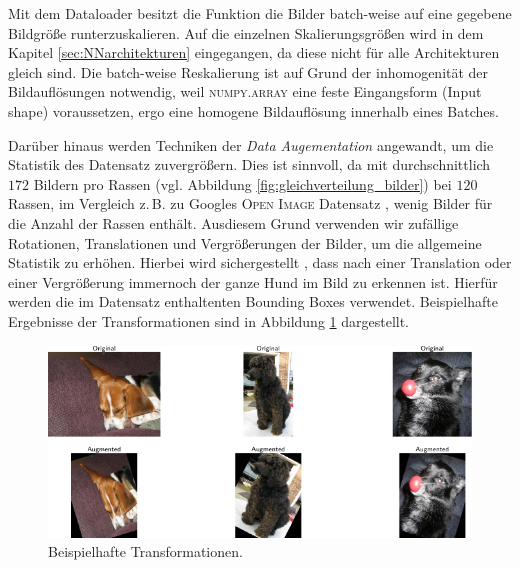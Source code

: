 Mit dem Dataloader besitzt die Funktion die Bilder batch-weise auf eine gegebene
Bildgröße runterzuskalieren. Auf die einzelnen Skalierungsgrößen wird in dem
Kapitel \ref{sec:NNarchitekturen} eingegangen, da diese nicht für alle Architekturen
gleich sind. Die batch-weise Reskalierung ist auf Grund der inhomogenität
der Bildauflösungen notwendig, weil \textsc{numpy.array}
eine feste Eingangsform (Input shape) voraussetzen, ergo eine homogene Bildauflösung
innerhalb eines Batches.

Darüber hinaus werden Techniken der \emph{Data Augementation} angewandt, um
die Statistik des Datensatz zuvergrößern. Dies ist sinnvoll, da mit durchschnittlich
$172$ Bildern pro Rassen (vgl. Abbildung \ref{fig:gleichverteilung_bilder})
bei $120$ Rassen, im Vergleich z.\,B. zu Googles \textsc{Open Image} Datensatz
\cite{google_open_image}, wenig Bilder für die Anzahl der Rassen enthält.
Ausdiesem Grund verwenden wir zufällige Rotationen, Translationen und Vergrößerungen
der Bilder, um die allgemeine Statistik zu erhöhen. Hierbei wird sichergestellt
, dass nach einer Translation oder einer Vergrößerung immernoch der ganze Hund
im Bild zu erkennen ist. Hierfür werden die im Datensatz enthaltenten Bounding
Boxes verwendet. Beispielhafte Ergebnisse der Transformationen sind in Abbildung
\ref{fig:data_augementation} dargestellt.
\begin{figure}
\centering
\includegraphics[width=\the\textwidth]{../../final_data/general/data_augementation.pdf}
\caption{Beispielhafte Transformationen.}
\label{fig:data_augementation}
\end{figure}

